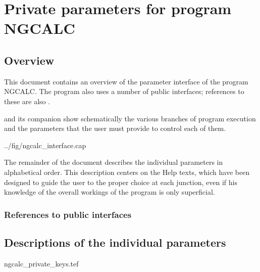 
\chapter{ Private parameters for program NGCALC}
\tableofcontents


\section{ Overview}

	This document contains an overview of the parameter interface of the
program NGCALC. The program also uses a number of public interfaces; references
to these are also .

	 and its companion 
show schematically the various branches of program execution and the parameters
that the user must provide to control each of them.

 {../fig/ngcalc_interface.cap}

	The remainder of the document describes the individual parameters in
alphabetical order. This description centers on the Help texts, which have been
designed to guide the user to the proper choice at each junction, even if his
knowledge of the overall workings of the program is only superficial.

\subsection{ References to public interfaces}
\label{.public}

\section{ Descriptions of the individual parameters}
\label{.descriptions}


 {ngcalc_private_keys.tef}
